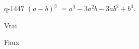 \begin{truefalse}{q-1447}
$(a-b)^3$ $=a^3-3a^2b-3ab^2+b^3$.
\item* Vrai
\item Faux
\end{truefalse}

